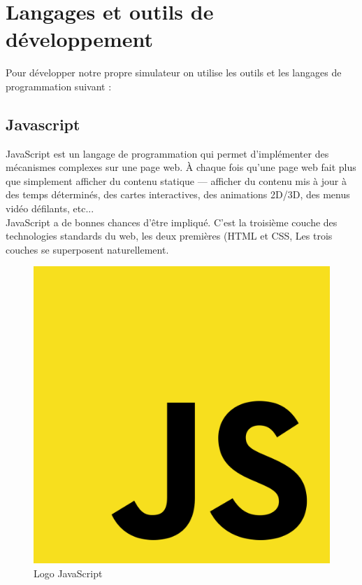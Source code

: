 \section{Langages et outils de développement}
Pour développer notre propre simulateur on utilise les outils et les langages de programmation suivant :

\subsection{Javascript}
JavaScript est un langage de programmation qui permet d’implémenter des mécanismes complexes sur une page web. À chaque fois qu’une page web fait plus que simplement afficher du contenu statique — afficher du contenu mis à jour à des temps déterminés, des cartes interactives, des animations 2D/3D, des menus vidéo défilants, etc... 
\\JavaScript a de bonnes chances d’être impliqué. C’est la troisième couche des technologies standards du web, les deux premières (HTML et CSS, Les trois couches se superposent naturellement. 
\begin{figure}[h]
	\centering
    \includegraphics[scale=0.1]{img/part3/4.1}
    \caption{Logo JavaScript}
\end{figure}

